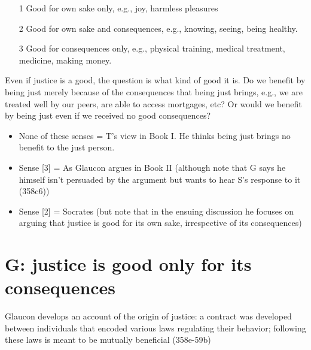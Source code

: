 \documentclass[oneside]{article}
\begin{document}
\begin{enumerate}
\item[1] Good for own sake only, e.g., joy, harmless pleasures
\item[2] Good for own sake and consequences, e.g., knowing, seeing, being healthy.
\item[3] Good for consequences only, e.g., physical training, medical treatment, medicine, making money.
\end{enumerate}
Even if justice is a good, the question is what kind of good it is. Do we benefit by being just merely because of the consequences that being just brings, e.g., we are treated well by our peers, are able to access mortgages, etc? Or would we benefit by being just even if we received no good consequences? 

\begin{itemize}
\item{None of these senses = T's view in Book I. He thinks being just brings no benefit to the just person.}
\item{Sense [3] = As Glaucon argues in Book II (although note that G says he himself isn't persuaded by the argument but wants to hear S's response to it (358c6))}
\item{Sense [2] = Socrates (but note that in the ensuing discussion he focuses on arguing that justice is good for its own sake, irrespective of its consequences)}
\end{itemize}

\section*{G: justice is good only for its consequences}

Glaucon develops an account of the origin of justice: a contract was developed between individuals that encoded various laws regulating their behavior; following these laws is meant to be mutually beneficial (358e-59b)
\end{document}
